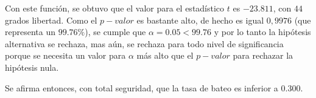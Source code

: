\documentclass{staprojteamusb}
\begin{document}
 Con este función, se obtuvo que el valor para el estadístico \(t\) es
 \(-23.811\), con \(44\) grados libertad. Como el \(p-valor\) es
 bastante alto, de hecho es igual \(0,9976\) (que representa un
 \(99.76\%\)), se cumple que \(\alpha=0.05<99.76\) y por lo tanto la
 hipótesis alternativa se rechaza, mas aún, se rechaza para todo nivel
 de significancia porque se necesita un valor para \(\alpha\) más alto
 que el \(p-valor\) para rechazar la hipótesis nula.

 Se afirma entonces, con total seguridad, que la tasa de bateo es
 inferior a \(0.300\).
	
	
	
	\printbibliography
	
	
	
	
\end{document}
